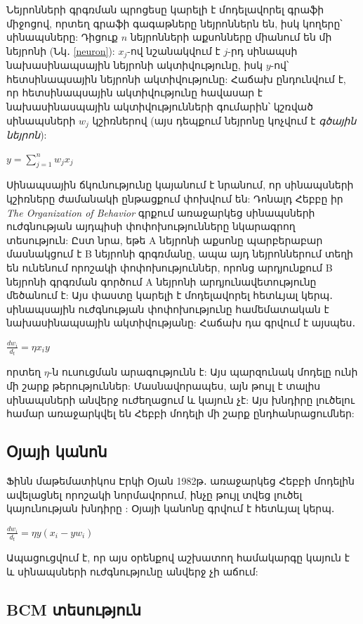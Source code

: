 \documentclass[12pt,final]{amsproc}
\begin{document}
Նեյրոնների գրգռման պրոցեսը կարելի է մոդելավորել գրաֆի միջոցով, որտեղ գրաֆի գագաթները նեյրոններն են, իսկ կողերը՝ սինապսները: Դիցուք $n$ նեյրոնների աքսոնները միանում են մի նեյրոնի (Նկ․ \ref{neuron}): $x_j$-ով նշանակվում է $j$-րդ սինապսի նախասինապսային նեյրոնի ակտիվությունը, իսկ $y$-ով՝ հետսինապսային նեյրոնի ակտիվությունը: Հաճախ ընդունվում է, որ հետսինապսային ակտիվությունը հավասար է նախասինասպային ակտիվությունների գումարին՝ կշռված սինապսների $w_j$ կշիռներով (այս դեպքում նեյրոնը կոչվում է \textit{գծային նեյրոն}):
\begin{center}
$y=\sum\limits_{j=1}^{n}w_jx_j$
\end{center}

Սինապսային ճկունությունը կայանում է նրանում, որ սինապսների կշիռները ժամանակի ընթացքում փոխվում են: Դոնալդ Հեբբը իր \textit{The Organization of Behavior} \cite{Hebb194912} գրքում առաջարկեց սինապսների ուժգնության այդպիսի փոփոխությունները նկարագրող տեսություն: Ըստ նրա, եթե A նեյրոնի աքսոնը պարբերաբար մասնակցում է B նեյրոնի գրգռմանը, ապա այդ նեյրոններում տեղի են ունենում որոշակի փոփոխություններ, որոնց արդյունքում B նեյրոնի գրգռման գործում A նեյրոնի արդյունավետությունը մեծանում է: Այս փաստը կարելի է մոդելավորել հետևյալ կերպ․ սինապսային ուժգնության փոփոխությունը համեմատական է նախասինապսային ակտիվությանը: Հաճախ դա գրվում է այսպես․
\begin{center}
$\frac{dw_i}{d_t}=\eta x_i y$
\end{center}
որտեղ $\eta$-ն ուսուցման արագությունն է: Այս պարզունակ մոդելը ունի մի շարք թերություններ: Մասնավորապես, այն թույլ է տալիս սինապսների անվերջ ուժեղացում և կայուն չէ: Այս խնդիրը լուծելու համար առաջարկվել են Հեբբի մոդելի մի շարք ընդհանրացումներ: 

\subsection{Օյայի կանոն}
Ֆինն մաթեմատիկոս Էրկի Օյան 1982թ․ առաջարկեց Հեբբի մոդելին ավելացնել որոշակի նորմավորում, ինչը թույլ տվեց լուծել կայունության խնդիրը \cite{Oja}: Օյայի կանոնը գրվում է հետևյալ կերպ․
\begin{center}
$\frac{dw_i}{d_t}=\eta y (x_i - yw_i)$
\end{center}
Ապացուցվում է, որ այս օրենքով աշխատող համակարգը կայուն է և սինապսների ուժգնությունը անվերջ չի աճում:

\subsection{BCM տեսություն}
\end{document}
